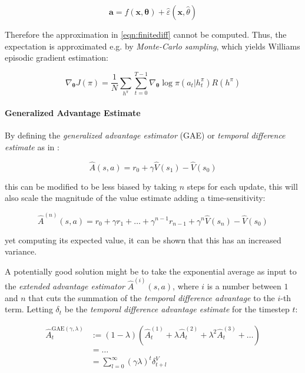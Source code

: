 \begin{equation}
    \mathbf{a} = f(\mathbf{x}, \boldsymbol{\theta}) + \hat{\varepsilon}(\mathbf{x}, \hat{\theta})
\end{equation}


Therefore the approximation in \cref{eqn:finitediff} cannot be computed. Thus, the expectation is approximated e.g. by \textit{Monte-Carlo sampling}, which yields Williams \cite{williams_simple_1992} episodic gradient estimation:

\begin{equation}
    \nabla _{\boldsymbol{\theta}} J(\pi) = \frac{1}{N} \sum _{h^{\pi}} \sum ^{T-1} _{t = 0} \nabla _{\boldsymbol{\theta}} \log \pi(a _t | h _t ^{\pi}) R(h ^{\pi})
\end{equation}


\paragraph{Generalized Advantage Estimate}
By defining the \textit{generalized advantage estimator} (\ac{GAE}) or \textit{temporal difference estimate} as in \cite{schulman_high-dimensional_2018}:

\begin{equation}
    \hat{A}(s,a) = r _0 + \gamma \hat{V}(s _1) - \hat{V}(s _0)
\end{equation}

this can be modified to be less biased by taking $n$ steps for each update, this will also scale the magnitude of the value estimate adding a time-sensitivity:

\begin{equation}
    \hat{A} ^{(n)} (s,a) = r _0 + \gamma r _1 + \dots + \gamma ^{n-1} r _{n-1} + \gamma ^n \hat{V}(s _n) - \hat{V}(s _0)
\end{equation}

yet computing its expected value, it can be shown that this has an increased variance.

A potentially good solution might be to take the exponential average as input to the \textit{extended advantage estimator} $\hat{A} ^{(i)}(s, a) $, where $i$ is a number between $1$ and $n$ that cuts the summation of the \textit{temporal difference advantage} to the $i$-th term. Letting $\delta _t$ be the \textit{temporal difference advantage estimate} for the timestep $t$:

\begin{align}
    \hat{A} _t ^{\text{GAE} (\gamma, \lambda)} & := (1 - \lambda)(\hat{A} _t ^{(1)} + \lambda \hat{A} _t ^{(2)} + \lambda ^2 \hat{A} _t ^{(3)} + \dots) \\
                                               & = \dots \nonumber                                                                                      \\
                                               & = \sum ^{ \infty } _{l = 0} (\gamma \lambda) ^t \delta ^V _{t+l} \nonumber
\end{align}

